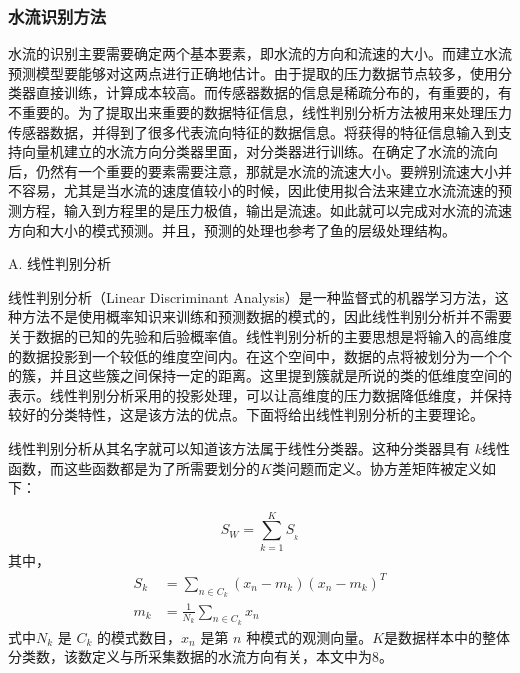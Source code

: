 \subsubsection{ 水流识别方法 }

水流的识别主要需要确定两个基本要素，即水流的方向和流速的大小。而建立水流预测模型要能够对这两点进行正确地估计。由于提取的压力数据节点较多，使用分类器直接训练，计算成本较高。而传感器数据的信息是稀疏分布的，有重要的，有不重要的。为了提取出来重要的数据特征信息，线性判别分析方法被用来处理压力传感器数据，并得到了很多代表流向特征的数据信息。将获得的特征信息输入到支持向量机建立的水流方向分类器里面，对分类器进行训练。在确定了水流的流向后，仍然有一个重要的要素需要注意，那就是水流的流速大小。要辨别流速大小并不容易，尤其是当水流的速度值较小的时候，因此使用拟合法来建立水流流速的预测方程，输入到方程里的是压力极值，输出是流速。如此就可以完成对水流的流速方向和大小的模式预测。并且，预测的处理也参考了鱼的层级处理结构\cite{yang2010artificial}。

A. {线性判别分析}

线性判别分析（{Linear Discriminant Analysis}）是一种监督式的机器学习方法，这种方法不是使用概率知识来训练和预测数据的模式的，因此线性判别分析并不需要关于数据的已知的先验和后验概率值。线性判别分析的主要思想是将输入的高维度的数据投影到一个较低的维度空间内。在这个空间中，数据的点将被划分为一个个的簇，并且这些簇之间保持一定的距离。这里提到簇就是所说的类的低维度空间的表示。线性判别分析采用的投影处理，可以让高维度的压力数据降低维度，并保持较好的分类特性，这是该方法的优点。下面将给出线性判别分析的主要理论。

线性判别分析从其名字就可以知道该方法属于线性分类器。这种分类器具有 $k$线性函数，而这些函数都是为了所需要划分的$K$类问题而定义。协方差矩阵被定义如下\cite{martis2013ecg,chen2000new}：

\begin{equation}
{S_W} = \sum\limits_{k = 1}^K {{S_{_k}}}
\label{eq:chap3:19}
\end{equation}
其中，
\begin{equation*}
\begin{aligned}
{S_k} &= \sum\limits_{n \in {C_k}} {\left( {{x_n} - {m_k}} \right){{\left( {{x_n} - {m_k}} \right)}^T}}\\
{m_k} &= \frac{1}{{{N_k}}}\sum\limits_{n \in {C_k}} {{x_n}}
\end{aligned}
\end{equation*}
式中$N_k$ 是 $C_k$ 的模式数目，$x_n$ 是第 $n$ 种模式的观测向量。$K$是数据样本中的整体分类数，该数定义与所采集数据的水流方向有关，本文中为8。

